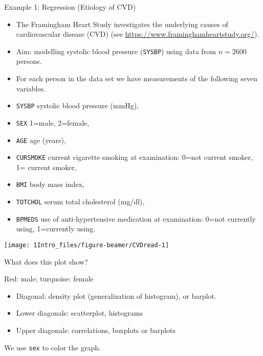 \documentclass[10pt,ignorenonframetext,]{beamer}
\providecommand{\tightlist}{%
  \setlength{\itemsep}{0pt}\setlength{\parskip}{0pt}}
\begin{document}
\begin{frame}[fragile]{Example 1: Regression (Etiology of CVD)}
\protect\hypertarget{example-1-regression-etiology-of-cvd}{}

\begin{itemize}
\item
  The Framingham Heart Study investigates the underlying causes of
  cardiovascular disease (CVD) (see
  \url{https://www.framinghamheartstudy.org/}). 
\item
  Aim: modelling systolic blood pressure (\texttt{SYSBP}) using data
  from \(n=2600\) persons.
\item
  For each person in the data set we have measurements of the following
  seven variables.
\end{itemize}

\scriptsize

\begin{itemize}
\tightlist
\item
  \texttt{SYSBP} systolic blood pressure (mmHg),
\item
  \texttt{SEX} 1=male, 2=female,
\item
  \texttt{AGE} age (years),
\item
  \texttt{CURSMOKE} current cigarette smoking at examination: 0=not
  current smoker, 1= current smoker,
\item
  \texttt{BMI} body mass index,
\item
  \texttt{TOTCHOL} serum total cholesterol (mg/dl),
\item
  \texttt{BPMEDS} use of anti-hypertensive medication at examination:
  0=not currently using, 1=currently using. \normalsize
\end{itemize}

\end{frame}

\begin{frame}

\begin{center}\texttt{[image: 1Intro\_files/figure-beamer/CVDread-1]} \end{center}

What does this plot show?

Red: male; turquoise: female

\end{frame}

\begin{frame}[fragile]

\begin{itemize}
\tightlist
\item
  Diagonal: density plot (generalization of histogram), or barplot.
\item
  Lower diagonals: scatterplot, histograms
\item
  Upper diagonals: correlations, boxplots or barplots
\end{itemize}

\vspace{2mm}

We use \texttt{sex} to color the graph.

\end{frame}
\end{document}
